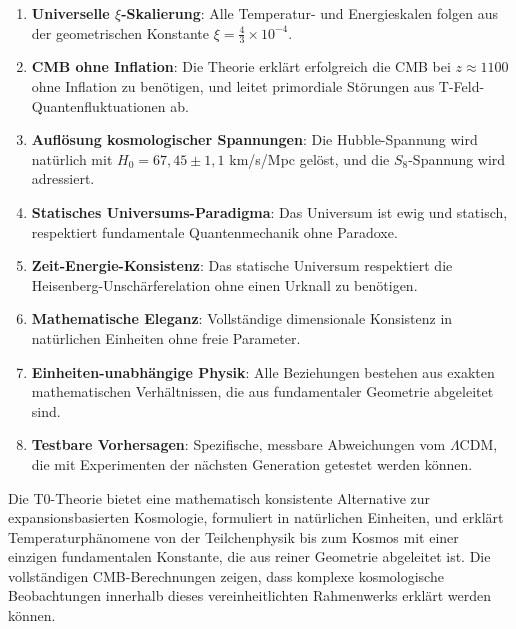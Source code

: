 \documentclass[12pt,a4paper]{article}
\begin{document}
	\begin{enumerate}
		\item \textbf{Universelle $\xi$-Skalierung}: Alle Temperatur- und Energieskalen folgen aus der geometrischen Konstante $\xi = \frac{4}{3} \times 10^{-4}$.
		
		\item \textbf{CMB ohne Inflation}: Die Theorie erklärt erfolgreich die CMB bei $z \approx 1100$ ohne Inflation zu benötigen, und leitet primordiale Störungen aus T-Feld-Quantenfluktuationen ab.
		
		\item \textbf{Auflösung kosmologischer Spannungen}: Die Hubble-Spannung wird natürlich mit $H_0 = 67,45 \pm 1,1$ km/s/Mpc gelöst, und die $S_8$-Spannung wird adressiert.
		
		\item \textbf{Statisches Universums-Paradigma}: Das Universum ist ewig und statisch, respektiert fundamentale Quantenmechanik ohne Paradoxe.
		
		\item \textbf{Zeit-Energie-Konsistenz}: Das statische Universum respektiert die Heisenberg-Unschärferelation ohne einen Urknall zu benötigen.
		
		\item \textbf{Mathematische Eleganz}: Vollständige dimensionale Konsistenz in natürlichen Einheiten ohne freie Parameter.
		
		\item \textbf{Einheiten-unabhängige Physik}: Alle Beziehungen bestehen aus exakten mathematischen Verhältnissen, die aus fundamentaler Geometrie abgeleitet sind.
		
		\item \textbf{Testbare Vorhersagen}: Spezifische, messbare Abweichungen vom $\Lambda$CDM, die mit Experimenten der nächsten Generation getestet werden können.
	\end{enumerate}
	
	\begin{revolutionary}
		Die T0-Theorie bietet eine mathematisch konsistente Alternative zur expansionsbasierten Kosmologie, formuliert in natürlichen Einheiten, und erklärt Temperaturphänomene von der Teilchenphysik bis zum Kosmos mit einer einzigen fundamentalen Konstante, die aus reiner Geometrie abgeleitet ist. Die vollständigen CMB-Berechnungen zeigen, dass komplexe kosmologische Beobachtungen innerhalb dieses vereinheitlichten Rahmenwerks erklärt werden können.
	\end{revolutionary}
	
\end{document}

